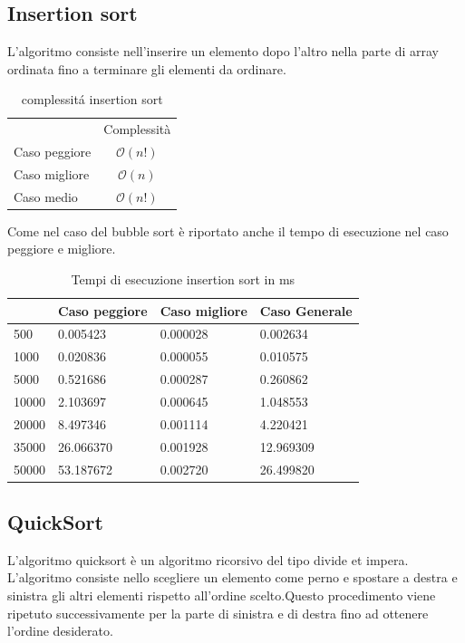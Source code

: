 \documentclass[12pt, a4paper]{report}
\begin{document}
\newpage
\subsection{Insertion sort}
L'algoritmo consiste nell'inserire un elemento dopo l'altro nella parte di array ordinata fino a terminare gli elementi da ordinare.

\begin{table}[ht]
	\centering
	\begin{tabular}{lc}
 & Complessità \\
Caso peggiore & $ \mathcal{O}(n!)$ \\
Caso migliore & $ \mathcal{O}(n)$ \\
Caso medio & $ \mathcal{O}(n!)$\\
\end{tabular}
	\caption{complessit\'a insertion sort}
	\label{Tab:CompInsertionSort}
\end{table}


	

Come nel caso del bubble sort è riportato anche il tempo di esecuzione nel caso peggiore e migliore.

\begin{table}[ht]
\centering
\begin{tabular}{| l | l | l | l |}
\hline
 & Caso peggiore & Caso migliore & Caso Generale \\ \hline
500 & 0.005423 & 0.000028 & 0.002634 \\ \hline
1000 & 0.020836	 & 0.000055 & 0.010575 \\ \hline
5000 & 0.521686 & 0.000287 & 0.260862 \\ \hline
10000 & 2.103697 & 0.000645 & 1.048553 \\ \hline
20000 & 8.497346 & 0.001114 & 4.220421 \\ \hline
35000 & 26.066370 & 0.001928 & 12.969309 \\ \hline
50000 & 53.187672 & 0.002720 & 26.499820 \\ \hline

\end{tabular}
\caption{Tempi di esecuzione insertion sort in ms}
\label{Tab:Tempi esecuzione InsertionSort}
\end{table}


\subsection{QuickSort}
L'algoritmo quicksort è un algoritmo ricorsivo del tipo divide et impera. L'algoritmo consiste nello scegliere un elemento come perno e spostare a destra e sinistra gli altri elementi rispetto all'ordine scelto.Questo procedimento viene ripetuto successivamente per la parte di sinistra e di destra fino ad ottenere l'ordine desiderato.
\end{document}
